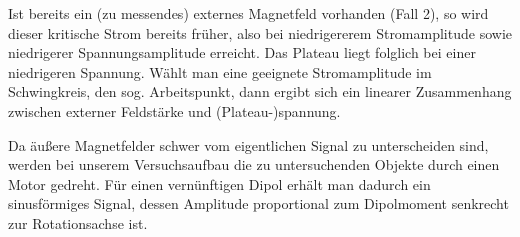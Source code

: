 Ist bereits ein (zu messendes) externes Magnetfeld vorhanden (Fall 2), so wird dieser kritische Strom bereits früher, also bei niedrigererem Stromamplitude sowie niedrigerer Spannungsamplitude erreicht. Das Plateau liegt folglich bei einer niedrigeren Spannung. Wählt man eine geeignete Stromamplitude im Schwingkreis, den sog. Arbeitspunkt, dann ergibt sich ein linearer Zusammenhang zwischen externer Feldstärke und (Plateau-)spannung.   

Da äußere Magnetfelder schwer vom eigentlichen Signal zu unterscheiden sind, werden bei unserem Versuchsaufbau die zu untersuchenden Objekte durch einen Motor gedreht. Für einen vernünftigen Dipol erhält man dadurch ein sinusförmiges Signal, dessen Amplitude proportional zum Dipolmoment senkrecht zur Rotationsachse ist.

